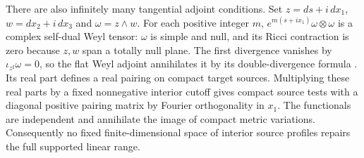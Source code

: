 \documentclass[11pt]{article}
\numberwithin{equation}{section}
\theoremstyle{definition}
\theoremstyle{remark}
\begin{document}
There are also infinitely many tangential adjoint conditions.
Set \(z=ds+i\,dx_1\), \(w=dx_2+i\,dx_3\) and \(\omega=z\wedge w\).
For each positive integer \(m\),
\(e^{m(s+ix_1)}\omega\otimes\omega\) is a complex self-dual Weyl
tensor: \(\omega\) is simple and null, and its Ricci contraction is
zero because \(z,w\) span a totally null plane. The first divergence
vanishes by \(\iota_{z^\sharp}\omega=0\), so the flat Weyl adjoint
annihilates it by its double-divergence formula
\cite[\S1.1]{GoverGursky2024}. Its real part defines a real pairing on
compact target sources. Multiplying these real parts by a fixed
nonnegative interior cutoff gives compact source tests with a diagonal
positive pairing matrix by Fourier orthogonality in \(x_1\). The
functionals are independent and annihilate the image of compact
metric variations. Consequently no fixed finite-dimensional space
of interior source profiles repairs the full supported linear range.
\end{document}
